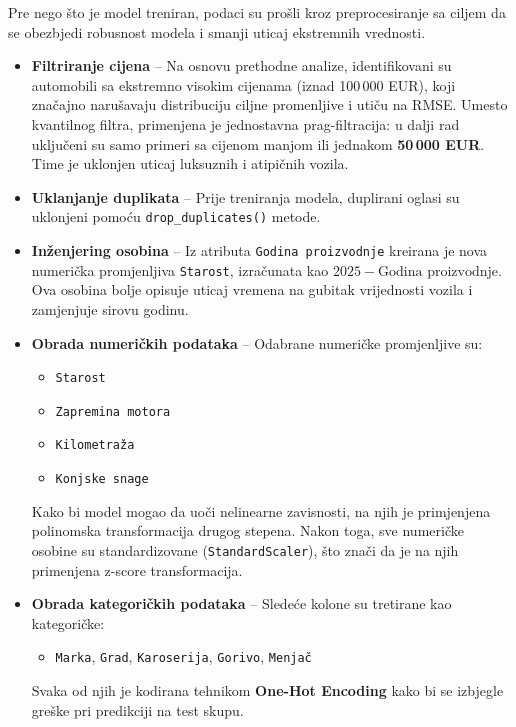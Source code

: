 \documentclass[a4paper,12pt]{article}
\begin{document}
Pre nego što je model treniran, podaci su prošli kroz preprocesiranje sa ciljem da se obezbjedi robusnost modela i smanji uticaj ekstremnih vrednosti.

\begin{itemize}
    \item \textbf{Filtriranje cijena} – Na osnovu prethodne analize, identifikovani su automobili sa ekstremno visokim cijenama (iznad 100\,000 EUR), koji značajno narušavaju distribuciju ciljne promenljive i utiču na RMSE. Umesto kvantilnog filtra, primenjena je jednostavna prag-filtracija: u dalji rad uključeni su samo primeri sa cijenom manjom ili jednakom \textbf{50\,000 EUR}. Time je uklonjen uticaj luksuznih i atipičnih vozila.

    \item \textbf{Uklanjanje duplikata} – Prije treniranja modela, duplirani oglasi su uklonjeni pomoću \texttt{drop\_duplicates()} metode.

    \item \textbf{Inženjering osobina} – Iz atributa \texttt{Godina proizvodnje} kreirana je nova numerička promjenljiva \texttt{Starost}, izračunata kao $2025 - \text{Godina proizvodnje}$. Ova osobina bolje opisuje uticaj vremena na gubitak vrijednosti vozila i zamjenjuje sirovu godinu.

    \item \textbf{Obrada numeričkih podataka} – Odabrane numeričke promjenljive su:
    \begin{itemize}
        \item \texttt{Starost}
        \item \texttt{Zapremina motora}
        \item \texttt{Kilometraža}
        \item \texttt{Konjske snage}
    \end{itemize}
    Kako bi model mogao da uoči nelinearne zavisnosti, na njih je primjenjena polinomska transformacija drugog stepena. Nakon toga, sve numeričke osobine su standardizovane (\texttt{StandardScaler}), što znači da je na njih primenjena z-score transformacija.

    \item \textbf{Obrada kategoričkih podataka} – Sledeće kolone su tretirane kao kategoričke:
    \begin{itemize}
        \item \texttt{Marka}, \texttt{Grad}, \texttt{Karoserija}, \texttt{Gorivo}, \texttt{Menjač}
    \end{itemize}
    Svaka od njih je kodirana tehnikom \textbf{One-Hot Encoding} kako bi se izbjegle greške pri predikciji na test skupu.


\end{itemize}
\end{document}
